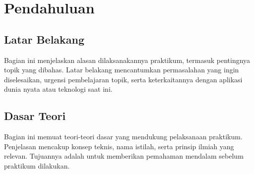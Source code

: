 \section{Pendahuluan}
\subsection{Latar Belakang}
Bagian ini menjelaskan alasan dilaksanakannya praktikum, termasuk pentingnya topik yang dibahas. Latar belakang mencantumkan permasalahan yang ingin diselesaikan, urgensi pembelajaran topik, serta keterkaitannya dengan aplikasi dunia nyata atau teknologi saat ini.

\subsection{Dasar Teori}
Bagian ini memuat teori-teori dasar yang mendukung pelaksanaan praktikum. Penjelasan mencakup konsep teknis, nama istilah, serta prinsip ilmiah yang relevan. Tujuannya adalah untuk memberikan pemahaman mendalam sebelum praktikum dilakukan.

